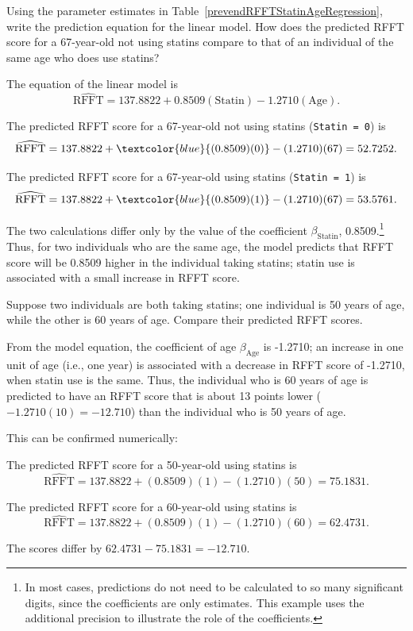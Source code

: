 \begin{example}{Using the parameter estimates in Table~\ref{prevendRFFTStatinAgeRegression}, write the prediction equation for the linear model. How does the predicted RFFT score for a 67-year-old not using statins compare to that of an individual of the same age who does use statins?}
	
The equation of the linear model is
\[\widehat{\text{RFFT}} = 137.8822 + 0.8509(\text{Statin}) - 1.2710(\text{Age}). \]	

The predicted RFFT score for a 67-year-old not using statins (\texttt{Statin = 0}) is
\[\widehat{\text{RFFT}} = 137.8822 + \textcolor{blue}{(0.8509)(0)} - (1.2710)(67) = 52.7252. \]

The predicted RFFT score for a 67-year-old using statins (\texttt{Statin = 1}) is
\[\widehat{\text{RFFT}} = 137.8822 + \textcolor{blue}{(0.8509)(1)} - (1.2710)(67) = 53.5761. \]


The two calculations differ only by the value of the coefficient $\beta_{\text{Statin}}$, 0.8509.\footnote{In most cases, predictions do not need to be calculated to so many significant digits, since the coefficients are only estimates. This example uses the additional precision to illustrate the role of the coefficients.} Thus, for two individuals who are the same age, the model predicts that RFFT score will be 0.8509 higher in the individual taking statins; statin use is associated with a small increase in RFFT score.
	
\end{example}

\begin{example}{Suppose two individuals are both taking statins; one individual is 50 years of age, while the other is 60 years of age. Compare their predicted RFFT scores.} 

From the model equation, the coefficient of age $\beta_{\text{Age}}$ is -1.2710; an increase in one unit of age (i.e., one year) is associated with a decrease in RFFT score of -1.2710, when statin use is the same. Thus, the individual who is 60 years of age is predicted to have an RFFT score that is about 13 points lower ($-1.2710(10) = -12.710$) than the individual who is 50 years of age. 

This can be confirmed numerically:

The predicted RFFT score for a 50-year-old using statins is
\[\widehat{\text{RFFT}} = 137.8822 + (0.8509)(1) - (1.2710)(50) = 75.1831. \]

The predicted RFFT score for a 60-year-old using statins is
\[\widehat{\text{RFFT}} = 137.8822 + (0.8509)(1) - (1.2710)(60) = 62.4731. \]

The scores differ by $62.4731 - 75.1831 = - 12.710.$
	
\end{example}

